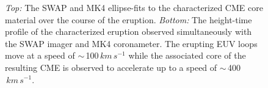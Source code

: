 \documentclass[namedreferences]{solarphysics}
\begin{document}
\begin{article}
\begin{figure}[t]
\caption{\emph{Top:} The SWAP and MK4 ellipse-fits to the characterized CME core material over the course of the eruption. \emph{Bottom:} The height-time profile of the characterized eruption observed simultaneously with the SWAP imager and MK4 coronameter. The erupting EUV loops move at a speed of $\sim$\,100$\,km\,s^{-1}$ while the associated core of the resulting CME is observed to accelerate up to a speed of $\sim$\,400$\,km\,s^{-1}$.}
\label{ell_heights_inner}
\end{figure}


\end{article}
\end{document}
